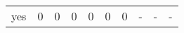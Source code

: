 \begin{longtable}{lp{1.3cm}p{1.3cm}p{1.3cm}p{1.3cm}p{1.3cm}p{1.3cm}p{1.3cm}p{1.3cm}p{1.3cm}}
yes       &                      0 &                                             0 &                                            0 &                                           0 &                                            0 &                                          0 &                                    - &                                      - &                                    - \\
\end{longtable}
